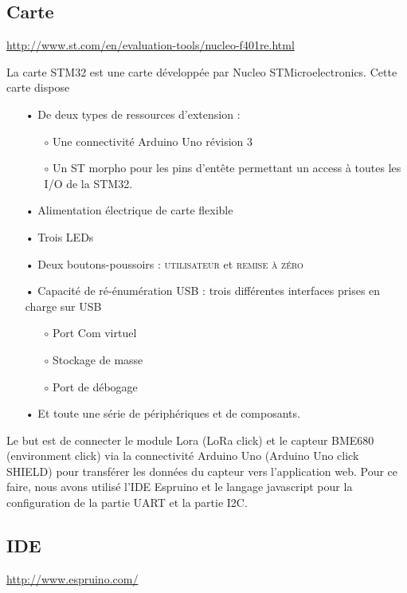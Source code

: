 \subsection{Carte}

\url{http://www.st.com/en/evaluation-tools/nucleo-f401re.html}
\vspace{2mm}

La carte STM32 est une carte développée par Nucleo STMicroelectronics. Cette carte dispose

\begin{itemize}
\item[•] De deux types de ressources d'extension :
\begin{itemize}
\item[$\circ$] Une connectivité Arduino Uno révision 3
\item[$\circ$] Un ST morpho pour les pins d'entête permettant un access à toutes les I/O de la STM32.
\end{itemize}
\item[•] Alimentation électrique de carte flexible
\item[•] Trois LEDs
\item[•] Deux boutons-poussoirs : \textsc{utilisateur} et \textsc{remise à zéro}
\item[•] Capacité de ré-énumération USB : trois différentes interfaces prises en charge sur USB
\begin{itemize}
\item[$\circ$] Port Com virtuel
\item[$\circ$] Stockage de masse
\item[$\circ$] Port de débogage
\end{itemize}
\item[•] Et toute une série de périphériques et de composants.
\end{itemize}
\vspace{2mm}

Le but est de connecter le module Lora (LoRa click) et le capteur BME680 (environment click) via la connectivité Arduino Uno (Arduino Uno click SHIELD) pour transférer les données du capteur vers l'application web. Pour ce faire, nous avons utilisé l'IDE Espruino et le langage javascript pour la configuration de la partie UART et la partie I2C.

\subsection{IDE}

\url{http://www.espruino.com/}
\vspace{2mm}

